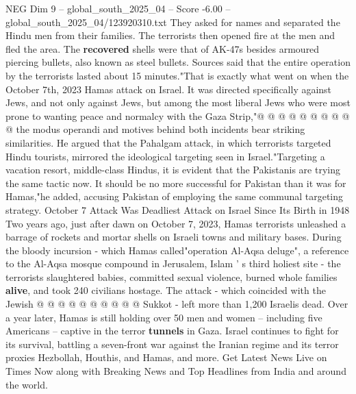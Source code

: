 \begin{textsample}{NEG Dim 9 – global\_south\_2025\_04 – Score -6.00 – global\_south\_2025\_04/123920310.txt}
They asked for names and separated the Hindu men from their families.
The terrorists then opened fire at the men and fled the area.
The \textbf{recovered} shells were that of AK-47s besides armoured piercing bullets, also known as steel bullets.
Sources said that the entire operation by the terrorists lasted about 15 minutes."That is exactly what went on when the October 7th, 2023 Hamas attack on Israel.
It was directed specifically against Jews, and not only against Jews, but among the most liberal Jews who were most prone to wanting peace and normalcy with the Gaza Strip,"@ @ @ @ @ @ @ @ @ @ the modus operandi and motives behind both incidents bear striking similarities.
He argued that the Pahalgam attack, in which terrorists targeted Hindu tourists, mirrored the ideological targeting seen in Israel."Targeting a vacation resort, middle-class Hindus, it is evident that the Pakistanis are trying the same tactic now.
It should be no more successful for Pakistan than it was for Hamas,"he added, accusing Pakistan of employing the same communal targeting strategy.
October 7 Attack Was Deadliest Attack on Israel Since Its Birth in 1948 Two years ago, just after dawn on October 7, 2023, Hamas terrorists unleashed a barrage of rockets and mortar shells on Israeli towns and military bases.
During the bloody incursion - which Hamas called"operation Al-Aqsa deluge", a reference to the Al-Aqsa mosque compound in Jerusalem, Islam ' s third holiest site - the terrorists slaughtered babies, committed sexual violence, burned whole families \textbf{alive}, and took 240 civilians hostage.
The attack - which coincided with the Jewish @ @ @ @ @ @ @ @ @ @ Sukkot - left more than 1,200 Israelis dead.
Over a year later, Hamas is still holding over 50 men and women -- including five Americans -- captive in the terror \textbf{tunnels} in Gaza.
Israel continues to fight for its survival, battling a seven-front war against the Iranian regime and its terror proxies Hezbollah, Houthis, and Hamas, and more.
Get Latest News Live on Times Now along with Breaking News and Top Headlines from India and around the world.

\end{textsample}
